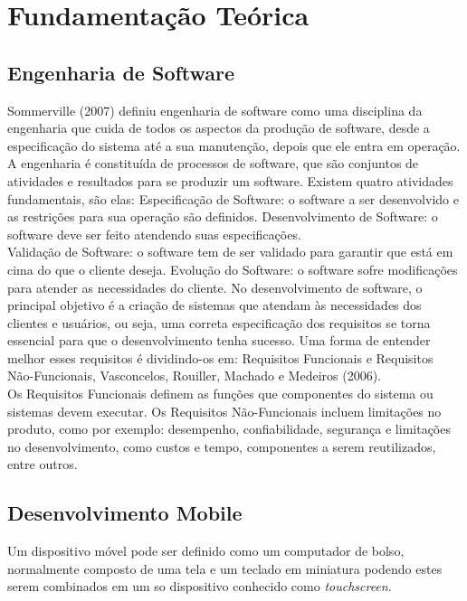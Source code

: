 \chapter{Fundamentação Teórica}
\label{cap:fundamentacao-teorica}

\section{Engenharia de Software}
\label{sec:engenharia-de-software}

Sommerville (2007) definiu engenharia de software como uma disciplina da engenharia que cuida de todos os aspectos da produção de software, desde a especificação do sistema até a sua manutenção, depois que ele entra em operação.\\ 
A engenharia é constituída de processos de software, que são conjuntos de atividades e resultados para se produzir um software. Existem quatro atividades fundamentais, são elas: 
Especificação de Software: o software a ser desenvolvido e as restrições para sua operação são definidos. 
Desenvolvimento de Software: o software deve ser feito atendendo suas especificações.\\ 
Validação de Software: o software tem de ser validado para garantir que está em cima do que o cliente deseja. 
Evolução do Software: o software sofre modificações para atender as necessidades do cliente. 
No desenvolvimento de software, o principal objetivo é a criação de sistemas que atendam às necessidades dos clientes e usuários, ou seja, uma correta especificação dos requisitos se torna essencial para que o desenvolvimento tenha sucesso. Uma forma de entender melhor esses requisitos é dividindo-os em: Requisitos Funcionais e Requisitos Não-Funcionais, Vasconcelos, Rouiller, Machado e Medeiros (2006).\\
Os Requisitos Funcionais definem as funções que componentes do sistema ou sistemas devem executar. 
Os Requisitos Não-Funcionais incluem limitações no produto, como por exemplo: desempenho, confiabilidade, segurança e limitações no desenvolvimento, como custos e tempo, componentes a serem reutilizados, entre outros.

\section{Desenvolvimento Mobile}
\label{sec:desenvolvimento-mobile}

Um dispositivo móvel pode ser definido como um computador de bolso, normalmente composto de uma tela e um teclado em miniatura podendo estes serem combinados em um so dispositivo conhecido como \textit{ touchscreen}.

